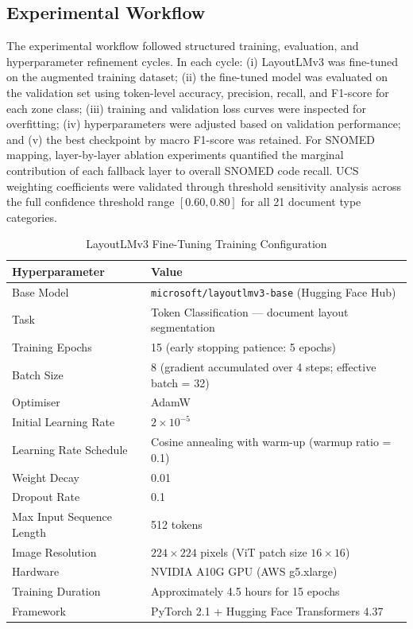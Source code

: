 \subsection{Experimental Workflow}
The experimental workflow followed structured training, evaluation, and hyperparameter refinement cycles. In each cycle: (i) LayoutLMv3 was fine-tuned on the augmented training dataset; (ii) the fine-tuned model was evaluated on the validation set using token-level accuracy, precision, recall, and F1-score for each zone class; (iii) training and validation loss curves were inspected for overfitting; (iv) hyperparameters were adjusted based on validation performance; and (v) the best checkpoint by macro F1-score was retained. For SNOMED mapping, layer-by-layer ablation experiments quantified the marginal contribution of each fallback layer to overall SNOMED code recall. UCS weighting coefficients were validated through threshold sensitivity analysis across the full confidence threshold range $[0.60, 0.80]$ for all 21 document type categories.

\begin{table}[htbp]
\centering
\caption{LayoutLMv3 Fine-Tuning Training Configuration}
\label{tab:training_config}
\begin{tabular}{|p{5cm}|p{8cm}|}
\hline
\textbf{Hyperparameter} & \textbf{Value} \\
\hline
Base Model & \texttt{microsoft/layoutlmv3-base} (Hugging Face Hub) \\
\hline
Task & Token Classification --- document layout segmentation \\
\hline
Training Epochs & 15 (early stopping patience: 5 epochs) \\
\hline
Batch Size & 8 (gradient accumulated over 4 steps; effective batch = 32) \\
\hline
Optimiser & AdamW \\
\hline
Initial Learning Rate & $2 \times 10^{-5}$ \\
\hline
Learning Rate Schedule & Cosine annealing with warm-up (warmup ratio = 0.1) \\
\hline
Weight Decay & 0.01 \\
\hline
Dropout Rate & 0.1 \\
\hline
Max Input Sequence Length & 512 tokens \\
\hline
Image Resolution & $224 \times 224$ pixels (ViT patch size $16 \times 16$) \\
\hline
Hardware & NVIDIA A10G GPU (AWS g5.xlarge) \\
\hline
Training Duration & Approximately 4.5 hours for 15 epochs \\
\hline
Framework & PyTorch 2.1 + Hugging Face Transformers 4.37 \\
\hline
\end{tabular}
\end{table}

